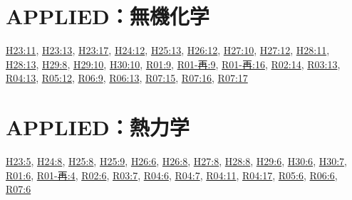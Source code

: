 \section{APPLIED：無機化学}
\hyperref[q:h23-reg-applied-11]{H23:11}, \hyperref[q:h23-reg-applied-13]{H23:13}, \hyperref[q:h23-reg-applied-17]{H23:17}, \hyperref[q:h24-reg-applied-12]{H24:12}, \hyperref[q:h25-reg-applied-13]{H25:13}, \hyperref[q:h26-reg-applied-12]{H26:12}, \hyperref[q:h27-reg-applied-10]{H27:10}, \hyperref[q:h27-reg-applied-12]{H27:12}, \hyperref[q:h28-reg-applied-11]{H28:11}, \hyperref[q:h28-reg-applied-13]{H28:13}, \hyperref[q:h29-reg-applied-08]{H29:8}, \hyperref[q:h29-reg-applied-10]{H29:10}, \hyperref[q:h30-reg-applied-10]{H30:10}, \hyperref[q:r01-reg-applied-09]{R01:9}, \hyperref[q:r01-ret-applied-09]{R01-再:9}, \hyperref[q:r01-ret-applied-16]{R01-再:16}, \hyperref[q:r02-reg-applied-14]{R02:14}, \hyperref[q:r03-reg-applied-13]{R03:13}, \hyperref[q:r04-reg-applied-13]{R04:13}, \hyperref[q:r05-reg-applied-12]{R05:12}, \hyperref[q:r06-reg-applied-09]{R06:9}, \hyperref[q:r06-reg-applied-13]{R06:13}, \hyperref[q:r07-reg-applied-15]{R07:15}, \hyperref[q:r07-reg-applied-16]{R07:16}, \hyperref[q:r07-reg-applied-17]{R07:17}
\section{APPLIED：熱力学}
\hyperref[q:h23-reg-applied-05]{H23:5}, \hyperref[q:h24-reg-applied-08]{H24:8}, \hyperref[q:h25-reg-applied-08]{H25:8}, \hyperref[q:h25-reg-applied-09]{H25:9}, \hyperref[q:h26-reg-applied-06]{H26:6}, \hyperref[q:h26-reg-applied-08]{H26:8}, \hyperref[q:h27-reg-applied-08]{H27:8}, \hyperref[q:h28-reg-applied-08]{H28:8}, \hyperref[q:h29-reg-applied-06]{H29:6}, \hyperref[q:h30-reg-applied-06]{H30:6}, \hyperref[q:h30-reg-applied-07]{H30:7}, \hyperref[q:r01-reg-applied-06]{R01:6}, \hyperref[q:r01-ret-applied-04]{R01-再:4}, \hyperref[q:r02-reg-applied-06]{R02:6}, \hyperref[q:r03-reg-applied-07]{R03:7}, \hyperref[q:r04-reg-applied-06]{R04:6}, \hyperref[q:r04-reg-applied-07]{R04:7}, \hyperref[q:r04-reg-applied-11]{R04:11}, \hyperref[q:r04-reg-applied-17]{R04:17}, \hyperref[q:r05-reg-applied-06]{R05:6}, \hyperref[q:r06-reg-applied-06]{R06:6}, \hyperref[q:r07-reg-applied-06]{R07:6}

